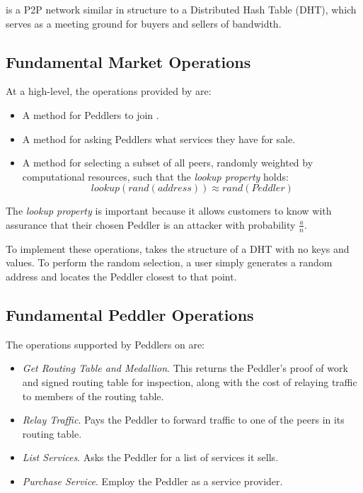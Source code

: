 
\TOM{} is a P2P network similar in structure to a Distributed Hash
Table (DHT), which serves as a meeting ground for buyers and sellers
of bandwidth.

\subsection{Fundamental Market Operations}

At a high-level, the operations provided by \tOM{} are:

\begin{itemize}
\item A method for Peddlers to join \tOM{}.
\item A method for asking Peddlers what services they have for sale.
\item A method for selecting a subset of all peers, randomly weighted by computational resources, such that the \emph{lookup property} holds: $$lookup(rand(address)) \approx rand(Peddler)$$
\end{itemize}

The \emph{lookup property} is important because it allows customers to
know with assurance that their chosen Peddler is an attacker with
probability $\frac{a}{n}$.

To implement these operations, \tOM{} takes the structure of a DHT
with no keys and values. To perform the random selection, a user
simply generates a random address and locates the Peddler closest to
that point.

\subsection{Fundamental Peddler Operations}

The operations supported by Peddlers on \tOM{} are:

\begin{itemize}
\item \emph{Get Routing Table and Medallion}. This returns the Peddler's proof of work and signed routing table for inspection, along with the cost of relaying traffic to members of the routing table.
\item \emph{Relay Traffic}. Pays the Peddler to forward traffic to one of the peers in its routing table.
\item \emph{List Services}. Asks the Peddler for a list of services it sells.
\item \emph{Purchase Service}. Employ the Peddler as a service provider.
\end{itemize}

